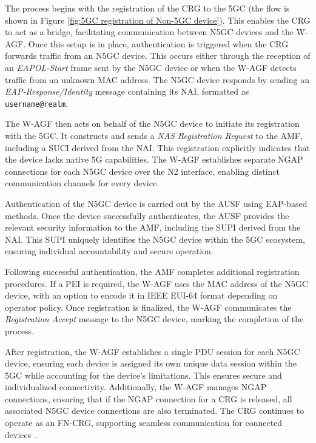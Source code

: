 The process begins with the registration of the \ac{CRG} to the \ac{5GC} (the flow is shown in Figure \ref{fig:5GC registration of Non-5GC device}). This enables the \ac{CRG} to act as a bridge, facilitating communication between \ac{N5GC} devices and the \ac{W-AGF}. Once this setup is in place, authentication is triggered when the \ac{CRG} forwards traffic from an \ac{N5GC} device. This occurs either through the reception of an \textit{\ac{EAPOL}-Start} frame sent by the \ac{N5GC} device or when the \ac{W-AGF} detects traffic from an unknown \ac{MAC} address. The \ac{N5GC} device responds by sending an \textit{\ac{EAP}-Response/Identity} message containing its \ac{NAI}, formatted as \texttt{username@realm}.

The \ac{W-AGF} then acts on behalf of the \ac{N5GC} device to initiate its registration with the \ac{5GC}. It constructs and sends a \textit{\ac{NAS} Registration Request} to the \ac{AMF}, including a \ac{SUCI} derived from the \ac{NAI}. This registration explicitly indicates that the device lacks native \ac{5G} capabilities. The \ac{W-AGF} establishes separate \ac{NGAP} connections for each \ac{N5GC} device over the N2 interface, enabling distinct communication channels for every device.

Authentication of the \ac{N5GC} device is carried out by the \ac{AUSF} using \ac{EAP}-based methods. Once the device successfully authenticates, the \ac{AUSF} provides the relevant security information to the \ac{AMF}, including the \ac{SUPI} derived from the \ac{NAI}. This \ac{SUPI} uniquely identifies the \ac{N5GC} device within the \ac{5GC} ecosystem, ensuring individual accountability and secure operation.

Following successful authentication, the \ac{AMF} completes additional registration procedures. If a \ac{PEI} is required, the \ac{W-AGF} uses the \ac{MAC} address of the \ac{N5GC} device, with an option to encode it in IEEE \ac{EUI-64} format depending on operator policy. Once registration is finalized, the \ac{W-AGF} communicates the \textit{Registration Accept} message to the \ac{N5GC} device, marking the completion of the process.

After registration, the \ac{W-AGF} establishes a single \ac{PDU} session for each \ac{N5GC} device, ensuring each device is assigned its own unique data session within the \ac{5GC} while accounting for the device's limitations. This ensures secure and individualized connectivity. Additionally, the \ac{W-AGF} manages \ac{NGAP} connections, ensuring that if the \ac{NGAP} connection for a \ac{CRG} is released, all associated \ac{N5GC} device connections are also terminated. The \ac{CRG} continues to operate as an \ac{FN-CRG}, supporting seamless communication for connected devices~\cite{23.316-p25}.


